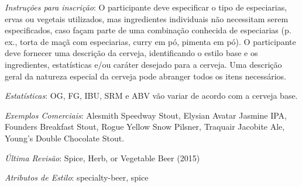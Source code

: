 \textit{Instruções para inscrição}: O participante deve especificar o tipo de especiarias, ervas ou vegetais utilizados, mas ingredientes individuais não necessitam serem especificados, caso façam parte de uma combinação conhecida de especiarias (p. ex., torta de maçã com especiarias, curry em pó, pimenta em pó). O participante deve fornecer uma descrição da cerveja, identificando o estilo base e os ingredientes, estatísticas e/ou caráter desejado para a cerveja. Uma descrição geral da natureza especial da cerveja pode abranger todos os itens necessários.

\textit{Estatísticas}: OG, FG, IBU, SRM e ABV vão variar de acordo com a cerveja base.

\textit{Exemplos Comerciais}: Alesmith Speedway Stout, Elysian Avatar Jasmine IPA, Founders Breakfast Stout, Rogue Yellow Snow Pilsner, Traquair Jacobite Ale, Young's Double Chocolate Stout.

\textit{Última Revisão}: Spice, Herb, or Vegetable Beer (2015)

\textit{Atributos de Estilo}: specialty-beer, spice
